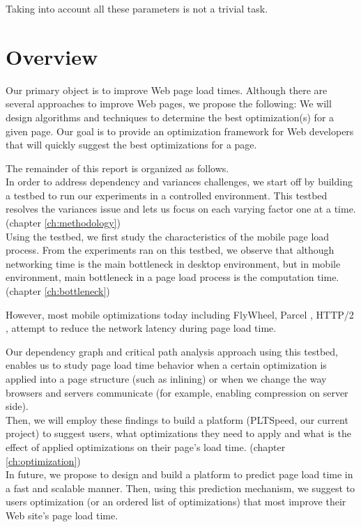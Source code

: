 \noindent \colorbox{gray!20}{\parbox{0.9\textwidth}{Taking into account all these parameters is not a trivial task.}}

\section{Overview}\label{overview}
Our primary object is to improve Web page load times. Although there are several approaches to improve Web pages, we propose the following: We will design algorithms and techniques to determine the best optimization(s) for a given page. Our goal is to provide an optimization framework for Web developers that will quickly suggest the best optimizations for a page.

\noindent The remainder of this report is organized as follows.\\
\noindent In order to address dependency and variances challenges, we start off by building a testbed to run our experiments in a controlled environment.
This testbed resolves the variances issue and lets us focus on each varying factor one at a time. (chapter \ref{ch:methodology})\\

\noindent Using the testbed, we first study the characteristics of the mobile page load process. From the experiments ran on this testbed, we observe that although networking time is the main bottleneck in desktop environment, but in mobile environment, main bottleneck in a page load process is the computation time. (chapter \ref{ch:bottleneck})

\noindent However, most mobile optimizations today including FlyWheel\cite{flywheel}, Parcel \cite{parcel}, HTTP/2 \cite{spdy}, attempt to reduce the network latency during page load time. 

\noindent Our dependency graph and critical path analysis approach using this testbed, enables us to study page load time behavior when a certain optimization is applied into a page structure (such as inlining) or when we change the way browsers and servers communicate (for example, enabling compression on server side).\\
\noindent Then, we will employ these findings to build a platform (PLTSpeed, our current project) to suggest users, what optimizations they need to apply and what is the effect of applied optimizations on their page's load time. (chapter \ref{ch:optimization})\\
\noindent In future, we propose to design and build a platform to predict page load time in a fast and scalable manner. Then, using this prediction mechanism, we suggest to users optimization (or an ordered list of optimizations) that most improve their Web site's page load time.\\





